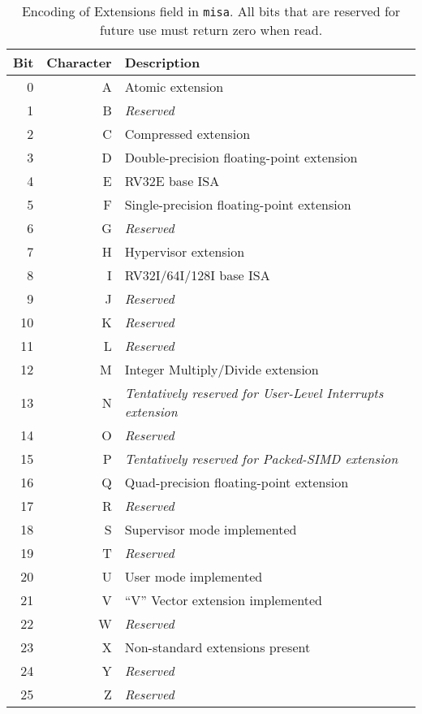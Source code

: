 \begin{table*}
\begin{center}
\begin{tabular}{|r|r|l|}
\hline
Bit & Character  & Description \\
\hline
  0 & A & Atomic extension \\
  1 & B & {\em Reserved} \\
  2 & C & Compressed extension \\
  3 & D & Double-precision floating-point extension \\
  4 & E & RV32E base ISA \\
  5 & F & Single-precision floating-point extension \\
  6 & G & {\em Reserved} \\
  7 & H & Hypervisor extension \\
  8 & I & RV32I/64I/128I base ISA \\
  9 & J & {\em Reserved} \\
 10 & K & {\em Reserved} \\
 11 & L & {\em Reserved} \\
 12 & M & Integer Multiply/Divide extension \\
 13 & N & {\em Tentatively reserved for User-Level Interrupts extension} \\
 14 & O & {\em Reserved} \\
 15 & P & {\em Tentatively reserved for Packed-SIMD extension} \\
 16 & Q & Quad-precision floating-point extension \\
 17 & R & {\em Reserved} \\
 18 & S & Supervisor mode implemented \\
 19 & T & {\em Reserved} \\
 20 & U & User mode implemented \\
 21 & V & ``V'' Vector extension implemented \\
 22 & W & {\em Reserved} \\
 23 & X & Non-standard extensions present \\
 24 & Y & {\em Reserved} \\
 25 & Z & {\em Reserved} \\
\hline
\end{tabular}
\end{center}
\caption{Encoding of Extensions field in {\tt misa}.  All bits that are
  reserved for future use must return zero when read.}
\label{misaletters}
\end{table*}


